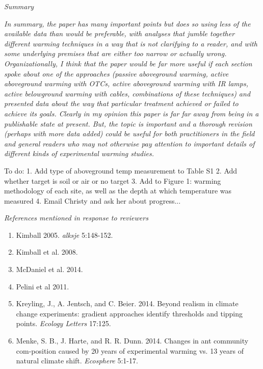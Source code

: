 \documentclass[11pt,a4paper]{letter}
\begin{document}
\emph{Summary}

\emph{In summary, the paper has many important points but does so using less of the available data
than would be preferable, with analyses that jumble together different warming techniques in a
way that is not clarifying to a reader, and with some underlying premises that are either too
narrow or actually wrong. Organizationally, I think that the paper would be far more useful if
each section spoke about one of the approaches (passive aboveground warming, active
aboveground warming with OTCs, active aboveground warming with IR lamps, active
belowground warming with cables, combinations of these techniques) and presented data
about the way that particular treatment achieved or failed to achieve its goals. Clearly in my
opinion this paper is far far away from being in a publishable state at present. But, the topic is
important and a thorough revision (perhaps with more data added) could be useful for both
practitioners in the field and general readers who may not otherwise pay attention to
important details of different kinds of experimental warming studies.}

To do:
1. Add type of aboveground temp measurement to Table S1
2. Add whether target is soil or air or no target
3. Add to Figure 1: warming methodology of each site, as well as the depth at which temperature was measured
4. Email Christy and ask her about progress...

\noindent \emph{References mentioned in response to reviewers}
\begin{footnotesize}
\begin{enumerate}
\item Kimball 2005.  \emph{alksje} 5:148-152.
\item Kimball et al. 2008.
\item McDaniel et al. 2014.
\item Pelini et al 2011.
\item Kreyling, J., A. Jentsch, and C. Beier. 2014.  Beyond realism in climate change experiments: gradient  approaches  identify  thresholds  and  tipping  points. \emph{Ecology Letters} 17:125.
\item Menke, S. B., J. Harte, and R. R. Dunn. 2014. Changes in ant community com-position caused by 20 years of experimental warming vs. 13 years of natural climate shift.  \emph{Ecosphere} 5:1-17.

\end{enumerate}
\end{footnotesize}
\end{document}
